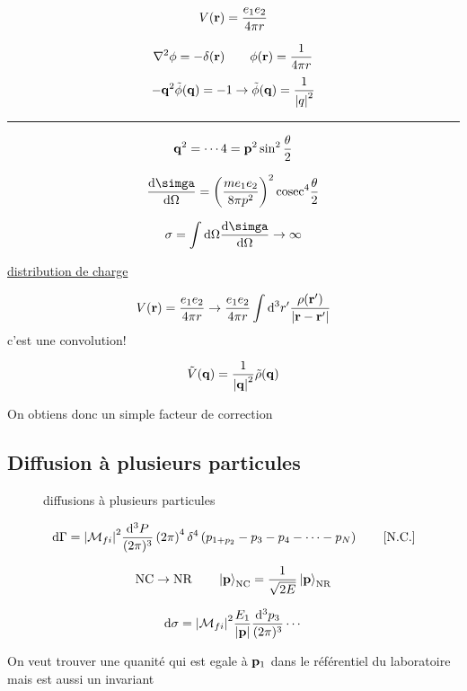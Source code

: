 \begin{tcolorbox}[title=Exemple: Loi de Coulomb]
$$V(\vb{r}) = \frac{e_1 e_{2}}{4\pi r} $$ 

$$\nabla^{2}\phi = - \delta(\vb{r}) \qquad \phi(\vb{r})= \frac{1}{4\pi{}r} $$ 
$$- \vb{q}^2 \tilde \phi (\vb{q}) = -1\to \tilde\phi(\vb{q})= \frac{1}{\abs{q}^2}  $$ 

\hrule 
$$\vb{q}^2 = \dotsb 4 = \vb{p}^2\sin^{2}\frac{\theta}{2} $$ 

$$\dv{\simga}{\Omega} = \left( \frac{m e_1 e_2 }{ 8\pi p^{2} }  \right)^2 \text{cosec} ^4 \frac{\theta}{2} $$ 

$$\sigma = \int \dd \Omega \dv{\simga}{\Omega} \to \infty$$ 

\underline{distribution de charge} 

$$V(\vb{r}) = \frac{e_1 e_2 }{4\pi r} \to \frac{e_1 e_2 }{4 \pi r} \int \dd^{3} r' \frac{\rho (\vb{r}')}{\abs{\vb{r}-\vb{r}'} } $$ 
c'est une convolution!

$$\tilde V (\vb{q}) = \frac{1}{\abs{\vb{q}}^{2}} \tilde \rho(\vb{q})$$ 

On obtiens donc un simple facteur de correction
\end{tcolorbox}


\subsection*{Diffusion à plusieurs particules}

\begin{figure}[ht]
    \centering
    \caption{diffusions à plusieurs particules}
    \label{fig:diffusions-à-plusieurs-particules}
\end{figure}


$$\dd \Gamma = \abs{\mathcal{M}_{fi}}^{2} \frac{\dd^{3}P}{(2\pi)^3} \left( 2\pi \right) ^4 \delta^4\left( p_{1+p_2} -p_3 -p_4 - \dotsb - p_N  \right) \qquad \text{[N.C.]}  $$ 

\begin{tcolorbox}[title=]
	$$\text{NC} \to \text{NR} \qquad \ket{\vb{p}}_{\text{NC}} = \frac{1}{\sqrt{2E}} \ket{\vb{p}}_{\text{NR}}    $$ 

	 
\end{tcolorbox}


$$\dd \sigma= \abs{\mathcal{M}_{fi}}^{2} \frac{E_1}{\abs{\vb{p}}} \frac{\dd^{3}p_{3}}{(2\pi)^3} \dotsb  $$ 

On veut trouver une quanité qui est egale à $\vb{p}_1$ dans le référentiel du laboratoire mais est aussi un invariant 



